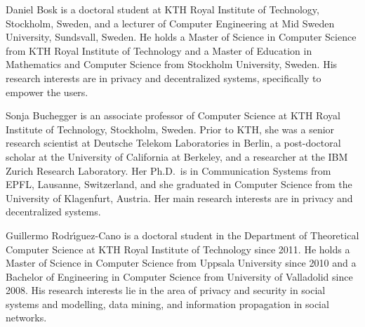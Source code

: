 \documentclass[a4paper]{llncs}
\begin{document}
Daniel Bosk is a doctoral student at KTH Royal Institute of Technology, 
Stockholm, Sweden, and a lecturer of Computer Engineering at Mid Sweden 
University, Sundsvall, Sweden.
He holds a Master of Science in Computer Science from KTH Royal Institute of 
Technology and a Master of Education in Mathematics and Computer Science from 
Stockholm University, Sweden.
His research interests are in privacy and decentralized systems, specifically 
to empower the users.

Sonja Buchegger is an associate professor of Computer Science at KTH Royal 
Institute of Technology, Stockholm, Sweden.
Prior to KTH, she was a
senior research scientist at Deutsche Telekom Laboratories in Berlin,
a post-doctoral scholar at the University of California at Berkeley,
and a researcher at the IBM Zurich Research Laboratory.
Her Ph.D.\ is in Communication Systems from EPFL, Lausanne, Switzerland, and 
she graduated in Computer Science from the University of Klagenfurt, Austria.
Her main research interests are in privacy and decentralized systems.

Guillermo Rodr\'{\i}guez-Cano is a doctoral student in the Department of 
Theoretical Computer Science at KTH Royal Institute of Technology since 2011.
He holds a Master of Science in Computer Science from Uppsala University since 
2010 and a Bachelor of Engineering in Computer Science from University of 
Valladolid since 2008.
His research interests lie in the area of privacy and security in social 
systems and modelling, data mining, and information propagation in social 
networks.
\end{document}
